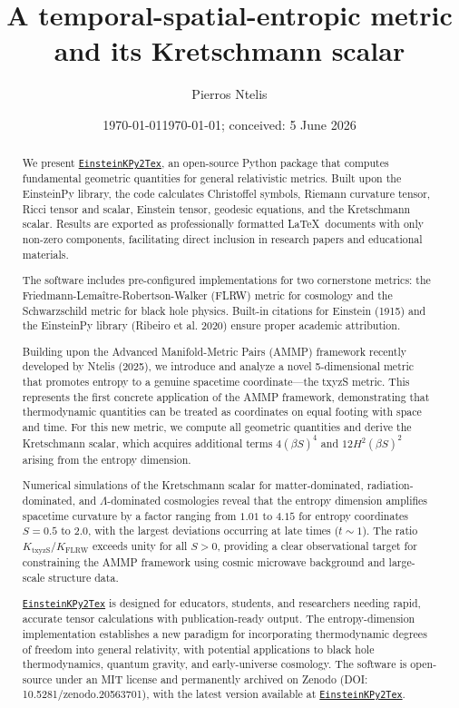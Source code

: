 \documentclass[11pt,a4paper]{article}
\date{\today}%
\author[$\dagger$,$\ddagger$]{Pierros Ntelis\orcidlink{0000-0002-7849-2418}}
\affil[$\dagger$]{School of Physics, Harbin Institute of Technology, Harbin 150001, People's Republic of China}
\affil[$\ddagger$]{Institute of Theoretical Physics, National University of Uzbekistan, Tashkent 100174, Uzbekistan}
\title{A temporal-spatial-entropic metric and its Kretschmann scalar}
\date{\today; conceived: 5 June 2026 }
\begin{document}
\maketitle

\begin{abstract}
We present \href{https://github.com/lontelis/Einsteinpy_to_latex}{{\color{cyan}\texttt{EinsteinKPy2Tex}}}, 
an open-source Python package that 
computes fundamental geometric quantities for general relativistic metrics. 
Built upon the EinsteinPy library, the code calculates Christoffel symbols, 
Riemann curvature tensor, Ricci tensor and scalar, Einstein tensor, geodesic 
equations, and the Kretschmann scalar. Results are exported as professionally 
formatted \LaTeX\ documents with only non-zero components, facilitating 
direct inclusion in research papers and educational materials.

The software includes pre-configured implementations for two cornerstone 
metrics: the Friedmann-Lema\^{i}tre-Robertson-Walker (FLRW) metric for 
cosmology and the Schwarzschild metric for black hole physics. Built-in 
citations for Einstein (1915) and the EinsteinPy library (Ribeiro et al. 
2020) ensure proper academic attribution.

Building upon the Advanced Manifold-Metric Pairs (AMMP) framework recently 
developed by Ntelis (2025), we introduce and analyze a novel 5-dimensional 
metric that promotes entropy to a genuine spacetime coordinate—the txyzS 
metric. This represents the first concrete application of the AMMP 
framework, demonstrating that thermodynamic quantities can be treated as 
coordinates on equal footing with space and time. For this new metric, we 
compute all geometric quantities and derive the Kretschmann scalar, which 
acquires additional terms $4(\beta S)^4$ and $12H^2(\beta S)^2$ arising 
from the entropy dimension.

Numerical simulations of the Kretschmann scalar for matter-dominated, 
radiation-dominated, and $\Lambda$-dominated cosmologies reveal that the 
entropy dimension amplifies spacetime curvature by a factor ranging from 
$1.01$ to $4.15$ for entropy coordinates $S = 0.5$ to $2.0$, with the largest 
deviations occurring at late times ($t \sim 1$). The ratio 
$K_{\text{txyzS}}/K_{\text{FLRW}}$ exceeds unity for all $S > 0$, providing 
a clear observational target for constraining the AMMP framework using 
cosmic microwave background and large-scale structure data.

\href{https://github.com/lontelis/Einsteinpy_to_latex}{{\color{cyan}\texttt{EinsteinKPy2Tex}}} 
is designed for educators, students, and 
researchers needing rapid, accurate tensor calculations with publication-ready 
output. The entropy-dimension implementation establishes a new paradigm 
for incorporating thermodynamic degrees of freedom into general relativity, 
with potential applications to black hole thermodynamics, quantum gravity, 
and early-universe cosmology. The software is open-source under an MIT 
license and permanently archived on Zenodo (DOI: 10.5281/zenodo.20563701), 
with the latest version available at \href{https://github.com/lontelis/Einsteinpy_to_latex}{{\color{cyan}\texttt{EinsteinKPy2Tex}}}.
\end{abstract}
\end{document}

